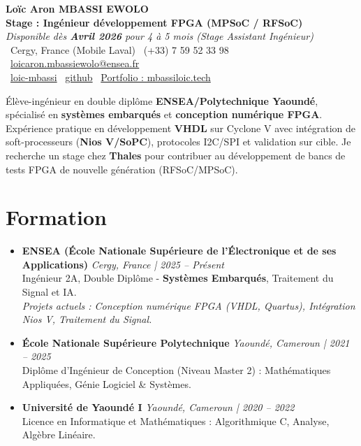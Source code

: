 \documentclass[a4paper,11pt]{article}
\begin{document}
\begin{center}
    {\Large \textbf{Loïc Aron MBASSI EWOLO}} \\ \vspace{4pt}
    \textbf{\large Stage : Ingénieur développement FPGA (MPSoC / RFSoC)} \\
    \textit{\small Disponible dès \textbf{Avril 2026} pour 4 à 5 mois (Stage Assistant Ingénieur)}\\
    \vspace{4pt}
    \small
    \faMapMarker\ Cergy, France (Mobile Laval) \quad
    \faPhone\ (+33) 7 59 52 33 98 \quad
    \faEnvelope\ \href{mailto:loicaron.mbassiewolo@ensea.fr}{loicaron.mbassiewolo@ensea.fr} \\ \vspace{2pt}
    \faLinkedin\ \href{https://www.linkedin.com/in/loic-mbassi}{loic-mbassi} \quad
    \faGithub\ \href{https://github.com/Nameless0l}{github} \quad
    \faGlobe\ \href{https://mbassiloic.tech/\#portfolio}{Portfolio : mbassiloic.tech}
\end{center}

\vspace{-6pt}

\noindent\small{Élève-ingénieur en double diplôme \textbf{ENSEA/Polytechnique Yaoundé}, spécialisé en \textbf{systèmes embarqués} et \textbf{conception numérique FPGA}. Expérience pratique en développement \textbf{VHDL} sur Cyclone V avec intégration de soft-processeurs (\textbf{Nios V/SoPC}), protocoles I2C/SPI et validation sur cible. Je recherche un stage chez \textbf{Thales} pour contribuer au développement de bancs de tests FPGA de nouvelle génération (RFSoC/MPSoC).}

\section{Formation}
\begin{itemize}[leftmargin=*, label={.}, nosep]
    \item \textbf{ENSEA (École Nationale Supérieure de l'Électronique et de ses Applications)} \hfill \textit{Cergy, France | 2025 -- Présent} \\
    \small{Ingénieur 2A, Double Diplôme - \textbf{Systèmes Embarqués}, Traitement du Signal et IA.} \\
    \textit{\small{Projets actuels : Conception numérique FPGA (VHDL, Quartus), Intégration Nios V, Traitement du Signal.}}
    \vspace{2pt}
    \item \textbf{École Nationale Supérieure Polytechnique} \hfill \textit{Yaoundé, Cameroun | 2021 -- 2025} \\
    \small{Diplôme d'Ingénieur de Conception (Niveau Master 2) : Mathématiques Appliquées, Génie Logiciel \& Systèmes.}
    \item \textbf{Université de Yaoundé I} \hfill \textit{Yaoundé, Cameroun | 2020 -- 2022} \\
    \small{Licence en Informatique et Mathématiques : Algorithmique C, Analyse, Algèbre Linéaire.}
\end{itemize}
\end{document}

